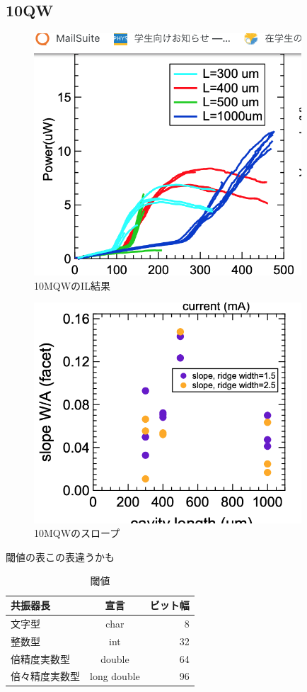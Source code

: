 \subsection{10QW}%
\begin{figure}[h]
	\centering
	\includegraphics[width=10cm]{figure/fig_3_1_IL_10QW.png}
		\caption{10MQWのIL結果}
		\label{fig_3_1_IL_10QW.png}
\end{figure}
\begin{figure}[h]
	\centering
	\includegraphics[width=10cm]{figure/fig_3_1_broad_slope_10QW.png}
		\caption{10MQWのスロープ}
		\label{fig_3_1_IL_broad_slope}
\end{figure}
閾値の表この表違うかも
\begin{table}[hbtp]
  \caption{閾値}
  \label{table:data_type}
  \centering
  \begin{tabular}{lcr}
    \hline
    共振器長  & 宣言  &  ビット幅  \\
    \hline \hline
    文字型  & char  & 8 \\
    整数型  & int   & 32 \\
    倍精度実数型  & double  & 64 \\
    倍々精度実数型  &  long double  &  96 \\
    \hline
  \end{tabular}
\end{table}

